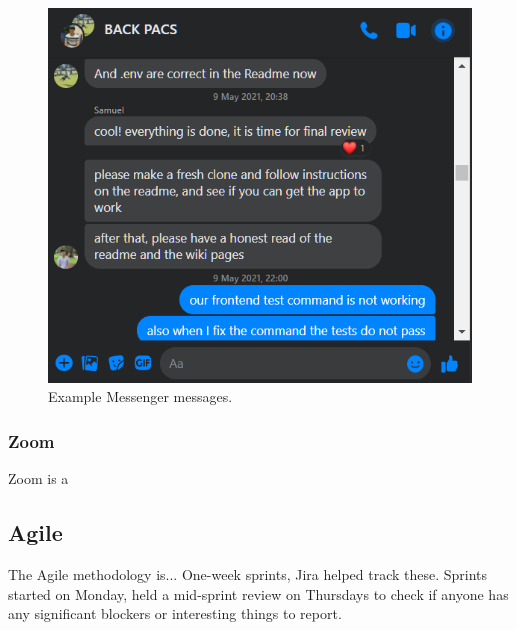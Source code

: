\documentclass[conference]{IEEEtran}
\begin{document}
\begin{figure}[htbp]
\centerline{\includegraphics[width = \linewidth]{messenger.png}}
\caption{Example Messenger messages.}
\label{fig}
\end{figure}

\subsubsection{Zoom}
Zoom is a 
\subsection{Agile}
The Agile methodology is...
One-week sprints, Jira helped track these. Sprints started on Monday, held a mid-sprint review on Thursdays to check if anyone has any significant blockers or interesting things to report.


\end{document}
